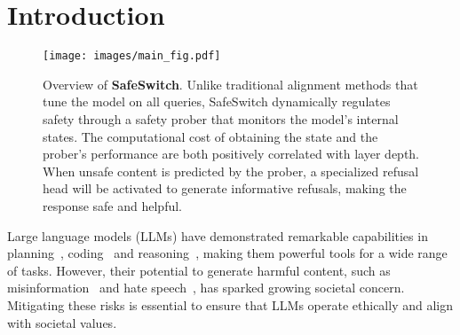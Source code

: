 \section{Introduction}



\begin{figure*}[htbp]
    \centering
    \texttt{[image: images/main\_fig.pdf]}
    \caption{Overview of \textbf{SafeSwitch}. Unlike traditional alignment methods that tune the model on all queries, SafeSwitch dynamically regulates safety through a safety prober that monitors the model’s internal states. The computational cost of obtaining the state and the prober’s performance are both positively correlated with layer depth. When unsafe content is predicted by the prober, a specialized refusal head will be activated to generate informative refusals, making the response safe and helpful.
    }
    \label{fig:pipeline}
\end{figure*}

Large language models (LLMs) have demonstrated remarkable capabilities in planning~\cite{valmeekam2023planning}, coding~\cite{chen2021evaluating,wang2024executable} and reasoning~\cite{yao2024tree,lightman2023let}, making them powerful tools for a wide range of tasks. However, their potential to generate harmful content, such as misinformation~\cite{zhang2023siren} and hate speech~\cite{albladi2025hate}, has sparked growing societal concern. Mitigating these risks is essential to ensure that LLMs operate ethically and align with societal values.

